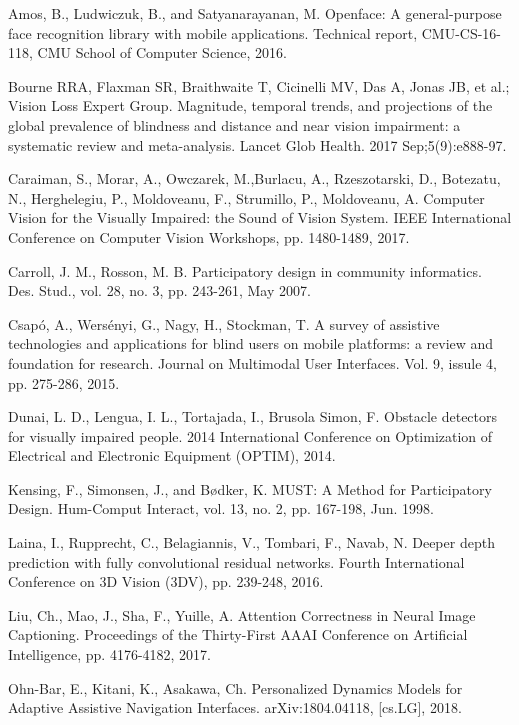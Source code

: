 \documentclass[10pt,conference,compsocconf]{IEEEtran}
\begin{document}
\begin{thebibliography}{1}
 Amos, B., Ludwiczuk, B., and Satyanarayanan, M. Openface:
A general-purpose face recognition library with mobile applications. Technical report, CMU-CS-16-118, CMU School of Computer Science, 2016.

 Bourne RRA, Flaxman SR, Braithwaite T, Cicinelli MV, Das A, Jonas JB, et al.; Vision Loss Expert Group. Magnitude, temporal trends, and projections of the global prevalence of blindness and distance and near vision impairment: a systematic review and meta-analysis. Lancet Glob Health.  2017 Sep;5(9):e888-97.

 Caraiman, S., Morar, A., Owczarek, M.,Burlacu, A., Rzeszotarski, D., Botezatu, N., Herghelegiu, P., Moldoveanu, F., Strumillo, P., Moldoveanu, A. Computer Vision for the Visually Impaired: the Sound of Vision System. IEEE International Conference on Computer Vision Workshops, pp. 1480-1489, 2017.

 Carroll, J. M., Rosson, M. B. Participatory design in community informatics. Des. Stud., vol. 28, no. 3, pp. 243-261, May 2007.

 Csap\'{o}, A., Wers\'{e}nyi, G., Nagy, H., Stockman, T. A survey of assistive technologies and applications for blind users on mobile platforms: a review and foundation for research. Journal on Multimodal User Interfaces. Vol. 9, issule 4,  pp. 275-286, 2015.

 Dunai, L. D., Lengua, I. L., Tortajada, I., Brusola Simon, F. Obstacle detectors for visually impaired people. 2014 International Conference on Optimization of Electrical and Electronic Equipment (OPTIM), 2014. 

 Kensing, F., Simonsen, J., and B\o dker, K. MUST: A Method for Participatory Design. Hum-Comput Interact, vol. 13, no. 2, pp. 167-198, Jun. 1998.


 Laina, I., Rupprecht, C., Belagiannis, V., Tombari, F., Navab, N. Deeper depth prediction with fully convolutional residual networks. Fourth International Conference on 3D Vision (3DV), pp. 239-248, 2016.

 Liu, Ch., Mao, J., Sha, F., Yuille, A. Attention Correctness in Neural Image Captioning. Proceedings of the Thirty-First AAAI Conference on Artificial Intelligence, pp. 4176-4182, 2017.

  Ohn-Bar, E., Kitani, K., Asakawa, Ch. Personalized Dynamics Models for Adaptive Assistive Navigation Interfaces. arXiv:1804.04118, [cs.LG], 2018.




\end{thebibliography}
\end{document}
